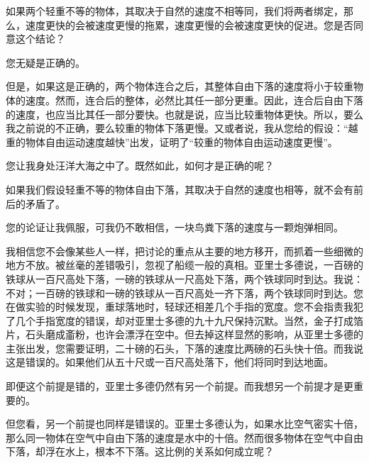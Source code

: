 \documentclass[12pt,UTF-8,openany]{ctexbook}
\begin{document}
\begin{normalsize}
\begin{description}[itemsep=1ex,leftmargin=4.5em,labelwidth=4em]
    \item[{\color{script-2-1} 萨为亚第}]如果两个轻重不等的物体，其取决于自然的速度不相等同，我们将两者绑定，那么，速度更快的会被速度更慢的拖累，速度更慢的会被速度更快的促进。您是否同意这个结论？
    
    \item[{\color{script-2-0} 心朴理休}]您无疑是正确的。
    
    \item[{\color{script-2-1} 萨为亚第}]但是，如果这是正确的，两个物体连合之后，其整体自由下落的速度将小于较重物体的速度。然而，连合后的整体，必然比其任一部分更重。因此，连合后自由下落的速度，也应当比其任一部分要快。也就是说，应当比较重物体更快。所以，要么我之前说的不正确，要么较重的物体下落更慢。又或者说，我从您给的假设：“越重的物体自由运动速度越快”出发，证明了“较重的物体自由运动速度更慢”。
    
    \item[{\color{script-2-0} 心朴理休}]您让我身处汪洋大海之中了。既然如此，如何才是正确的呢？
    
    \item[{\color{script-2-1} 萨为亚第}]如果我们假设轻重不等的物体自由下落，其取决于自然的速度也相等，就不会有前后的矛盾了。
    
    \item[{\color{script-2-0} 心朴理休}]您的论证让我佩服，可我仍不敢相信，一块鸟粪下落的速度与一颗炮弹相同。
    
    \item[{\color{script-2-1} 萨为亚第}]我相信您不会像某些人一样，把讨论的重点从主要的地方移开，而抓着一些细微的地方不放。被丝毫的差错吸引，忽视了船缆一般的真相。亚里士多德说，一百磅的铁球从一百尺高处下落，一磅的铁球从一尺高处下落，两个铁球同时到达。我说：不对；一百磅的铁球和一磅的铁球从一百尺高处一齐下落，两个铁球同时到达。您在做实验的时候发现，重球落地时，轻球还相差几个手指的宽度。您不会指责我犯了几个手指宽度的错误，却对亚里士多德的九十九尺保持沉默。当然，金子打成箔片，石头磨成齑粉，也许会漂浮在空中。但去掉这样显然的影响，从亚里士多德的主张出发，您需要证明，二十磅的石头，下落的速度比两磅的石头快十倍。而我说这是错误的。如果他们从五十尺或一百尺高处落下，他们将同时到达地面。
    
    \item[{\color{script-2-0} 心朴理休}]即便这个前提是错的，亚里士多德仍然有另一个前提。而我想另一个前提才是更重要的。
    
    \item[{\color{script-2-1} 萨为亚第}]但您看，另一个前提也同样是错误的。亚里士多德认为，如果水比空气密实十倍，那么同一物体在空气中自由下落的速度是水中的十倍。然而很多物体在空气中自由下落，却浮在水上，根本不下落。这比例的关系如何成立呢？
    

\end{description}
\end{normalsize}
\end{document}
